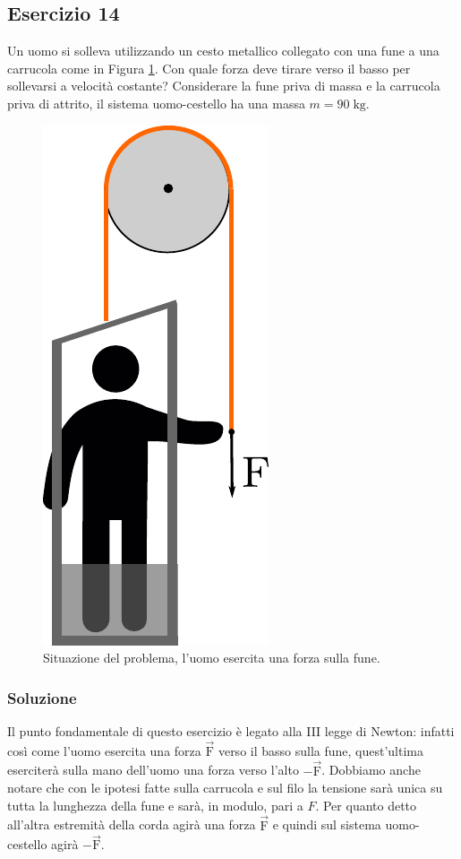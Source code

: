\documentclass[12pt,a4paper]{book}
\begin{document}
\subsection*{Esercizio 14}
Un uomo si solleva utilizzando un cesto metallico collegato con una fune a una carrucola come in Figura \ref{fig:4-e-17-1}. Con quale forza deve tirare verso il basso per sollevarsi a velocità costante? Considerare la fune priva di massa e la carrucola priva di attrito, il sistema uomo-cestello ha una massa $m=90\;\text{kg}$.


\begin{figure}[!h]
\centering
\includegraphics[scale=0.6]{e-17-1.pdf}
\caption{Situazione del problema, l'uomo esercita una forza sulla fune.} 
\label{fig:4-e-17-1} 
\end{figure}

\subsubsection*{Soluzione}
Il punto fondamentale di questo esercizio è legato alla III legge di Newton: infatti così come l'uomo esercita una forza $\vec{\text{F}}$ verso il basso sulla fune, quest'ultima eserciterà sulla mano dell'uomo una forza verso l'alto $-\vec{\text{F}}$. Dobbiamo anche notare che con le ipotesi fatte sulla carrucola e sul filo la tensione sarà unica su tutta la lunghezza della fune e sarà, in modulo, pari a $F$. Per quanto detto all'altra estremità della corda agirà una forza $\vec{\text{F}}$ e quindi sul sistema uomo-cestello agirà $-\vec{\text{F}}$.
\end{document}
